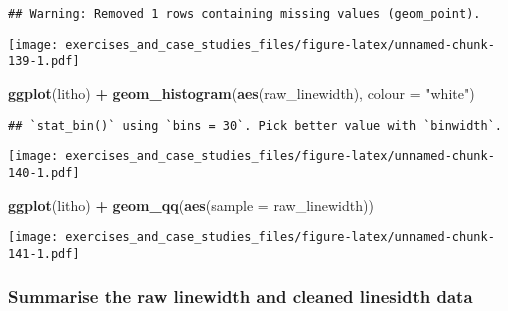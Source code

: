 \documentclass[]{book}
\newenvironment{Shaded}{\begin{snugshade}}{\end{snugshade}}
\newcommand{\DataTypeTok}[1]{\textcolor[rgb]{0.13,0.29,0.53}{#1}}
\newcommand{\KeywordTok}[1]{\textcolor[rgb]{0.13,0.29,0.53}{\textbf{#1}}}
\newcommand{\NormalTok}[1]{#1}
\newcommand{\OperatorTok}[1]{\textcolor[rgb]{0.81,0.36,0.00}{\textbf{#1}}}
\newcommand{\StringTok}[1]{\textcolor[rgb]{0.31,0.60,0.02}{#1}}
\theoremstyle{definition}
\theoremstyle{definition}
\theoremstyle{definition}
\theoremstyle{remark}
\begin{document}
\begin{verbatim}
## Warning: Removed 1 rows containing missing values (geom_point).
\end{verbatim}

\texttt{[image: exercises\_and\_case\_studies\_files/figure-latex/unnamed-chunk-139-1.pdf]}

\begin{Shaded}
\begin{Highlighting}[]
\KeywordTok{ggplot}\NormalTok{(litho) }\OperatorTok{+}
\StringTok{  }\KeywordTok{geom_histogram}\NormalTok{(}\KeywordTok{aes}\NormalTok{(raw_linewidth), }\DataTypeTok{colour =} \StringTok{"white"}\NormalTok{)}
\end{Highlighting}
\end{Shaded}

\begin{verbatim}
## `stat_bin()` using `bins = 30`. Pick better value with `binwidth`.
\end{verbatim}

\texttt{[image: exercises\_and\_case\_studies\_files/figure-latex/unnamed-chunk-140-1.pdf]}

\begin{Shaded}
\begin{Highlighting}[]
\KeywordTok{ggplot}\NormalTok{(litho) }\OperatorTok{+}
\StringTok{  }\KeywordTok{geom_qq}\NormalTok{(}\KeywordTok{aes}\NormalTok{(}\DataTypeTok{sample =}\NormalTok{ raw_linewidth))}
\end{Highlighting}
\end{Shaded}

\texttt{[image: exercises\_and\_case\_studies\_files/figure-latex/unnamed-chunk-141-1.pdf]}

\hypertarget{summarise-the-raw-linewidth-and-cleaned-linesidth-data}{%
\subsubsection{Summarise the raw linewidth and cleaned linesidth
data}\label{summarise-the-raw-linewidth-and-cleaned-linesidth-data}}

\begin{Shaded}
\end{Shaded}
\end{document}
